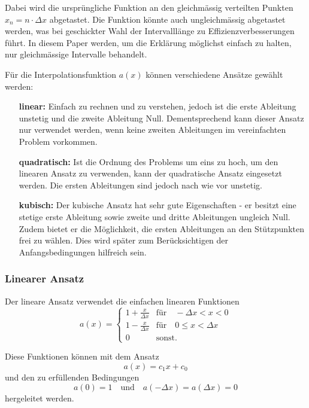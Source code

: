 Dabei wird die ursprüngliche Funktion an den gleichmässig verteilten Punkten $x_n = n \cdot \Delta x$ abgetastet. 
Die Funktion könnte auch ungleichmässig abgetastet werden, was bei geschickter Wahl der Intervalllänge zu Effizienzverbesserungen führt.
In diesem Paper werden, um die Erklärung möglichst einfach zu halten, nur gleichmässige Intervalle behandelt. 

Für die Interpolationsfunktion $a(x)$ können verschiedene Ansätze gewählt werden:
\begin{itemize}
    \item[\textbf{linear:}] 
        Einfach zu rechnen und zu verstehen, jedoch ist die erste Ableitung unstetig und die zweite Ableitung Null.
        Dementsprechend kann dieser Ansatz nur verwendet werden, wenn keine zweiten Ableitungen im vereinfachten Problem vorkommen.
    \item[\textbf{quadratisch:}]
        Ist die Ordnung des Problems um eins zu hoch, um den linearen Ansatz zu verwenden, kann der quadratische Ansatz eingesetzt werden.
        Die ersten Ableitungen sind jedoch nach wie vor unstetig.
    \item[\textbf{kubisch:}]  
        Der kubische Ansatz hat sehr gute Eigenschaften - er besitzt eine stetige erste Ableitung sowie zweite und dritte Ableitungen ungleich Null. 
        Zudem bietet er die Möglichkeit, die ersten Ableitungen an den Stützpunkten frei zu wählen.
        Dies wird später zum Berücksichtigen der Anfangsbedingungen hilfreich sein.
\end{itemize}

\subsubsection{Linearer Ansatz}
Der lineare Ansatz verwendet die einfachen linearen Funktionen
\begin{equation}
    a(x) = \left\{ \begin{array}{ll}
        1+\frac{x}{\Delta x} & \text{für} \quad -\Delta x < x < 0 \\
        1-\frac{x}{\Delta x} & \text{für} \quad 0 \leq x < \Delta x \\
        0                    & \text{sonst}.
    \end{array} \right.
\end{equation}

Diese Funktionen können mit dem Ansatz 
\begin{equation}
    a(x) = c_1x + c_0 %
\end{equation}
und den zu erfüllenden Bedingungen
\begin{equation}
        a(0) = 1 \quad
        \text{und} \quad
        a(-\Delta x) = a(\Delta x) = 0
\end{equation}
hergeleitet werden.

